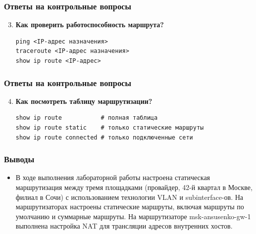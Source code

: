 \begin{frame}
\frametitle{Ответы на контрольные вопросы}
\begin{enumerate}
\setcounter{enumi}{2}
\item \textbf{Как проверить работоспособность маршрута?}
\begin{verbatim}
ping <IP-адрес назначения>
traceroute <IP-адрес назначения>
show ip route <IP-адрес>
\end{verbatim}
\end{enumerate}
\end{frame}

\begin{frame}
\frametitle{Ответы на контрольные вопросы}
\begin{enumerate}
\setcounter{enumi}{3}
\item \textbf{Как посмотреть таблицу маршрутизации?}
\begin{verbatim}
show ip route           # полная таблица
show ip route static    # только статические маршруты
show ip route connected # только подключенные сети
\end{verbatim}
\end{enumerate}
\end{frame}

\begin{frame}
\frametitle{Выводы}
\begin{itemize}
    \item В ходе выполнения лабораторной работы настроена статическая маршрутизация между тремя площадками (провайдер, 42-й квартал в Москве, филиал в Сочи) с использованием технологии VLAN и subinterface-ов. На маршрутизаторах настроены статические маршруты, включая маршруты по умолчанию и суммарные маршруты. На маршрутизаторе msk-ansusenko-gw-1 выполнена настройка NAT для трансляции адресов внутренних хостов.
    
\end{itemize}
\end{frame}


